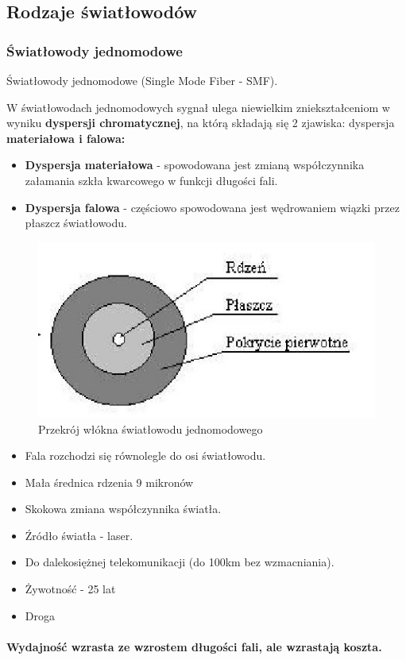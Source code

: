 \documentclass{article}
\begin{document}
\subsection{Rodzaje światłowodów}
\subsubsection{Światłowody jednomodowe}
Światłowody jednomodowe (Single Mode Fiber - SMF).

W światłowodach jednomodowych sygnał ulega niewielkim zniekształceniom w wyniku \textbf{dyspersji chromatycznej}, na którą składają się 2 zjawiska: dyspersja \textbf{materiałowa i falowa:}
\begin{itemize}
    \item \textbf{Dyspersja materiałowa} - spowodowana jest zmianą współczynnika załamania szkła kwarcowego w funkcji długości fali.
    \item \textbf{Dyspersja falowa} - częściowo spowodowana jest wędrowaniem wiązki przez płaszcz światłowodu.
\end{itemize}

\begin{figure}[H]
    \centering
    \includegraphics[width=0.4\linewidth]{w03z02.jpg}
    \caption{Przekrój włókna światłowodu jednomodowego}
\end{figure}

\begin{itemize}
    \item Fala rozchodzi się równolegle do osi światłowodu.
    \item Mała średnica rdzenia 9 mikronów
    \item Skokowa zmiana współczynnika światła.
    \item Źródło światła - laser.
    \item Do dalekosiężnej telekomunikacji (do 100km bez wzmacniania).
    \item Żywotność - 25 lat
    \item Droga
\end{itemize}
\paragraph{Wydajność wzrasta ze wzrostem długości fali, ale wzrastają koszta.}
\end{document}
